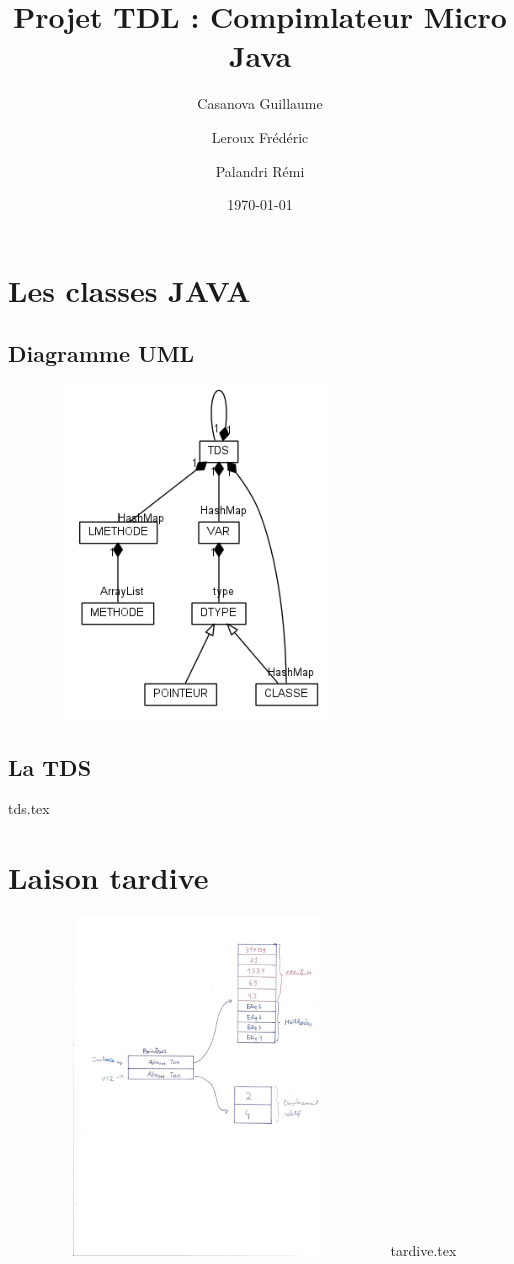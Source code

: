 \documentclass[12pt]{article}
\title{Projet TDL : Compimlateur Micro Java}
\author{ Casanova Guillaume \\
	\and 
	 Leroux Frédéric \\
	\and
	 Palandri Rémi
	}
\date{\today}
\begin{document}
\maketitle

\begin{abstract}

\end{abstract}

\newpage
\setcounter{tocdepth}{1} \tableofcontents

\newpage

\section{Les classes JAVA}
	
	\subsection{Diagramme UML}
		\includegraphics[width=10cm,height=88mm]{img/graph.png}
	\subsection{La TDS}
		
		{tds.tex}
\newpage
\section{Laison tardive}
		\includegraphics[width=10cm,height=90mm]{img/scan.jpeg}
		{tardive.tex}
\newpage
\end{document}
